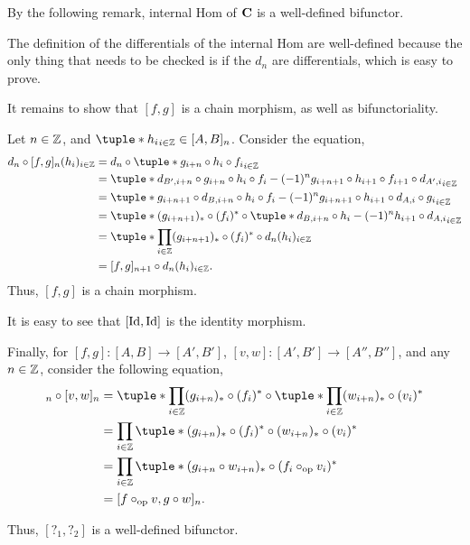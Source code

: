 By the following remark, internal Hom of \( \operatorname{\mathbf{C}} \) is a well-defined bifunctor.
\begin{remark}
    The definition of the differentials of the internal Hom are well-defined because the only thing that needs to be checked is if the \( d_n \) are differentials, which is easy to prove.

    It remains to show that \( [f, g] \) is a chain morphism, as well as bifunctoriality.

    Let \( n \in {\mathbb{Z}} \), and \( \tuple*{h_i}_{i \in \Zb} \in [A, B]_n \). Consider the equation,
    \begin{align*}
        d_n \circ [f, g]_n (h_i)_{i \in \Zb} &= d_n \circ \tuple*{g_{i + n} \circ h_i \circ f_i}_{i \in \Zb} \\
        &= \tuple*{d_{B', i + n} \circ g_{i + n} \circ h_i \circ f_i - (-1)^n g_{i + n + 1} \circ h_{i + 1} \circ f_{i + 1} \circ d_{A', i}}_{i \in \Zb} \\
        &= \tuple*{g_{i + n + 1} \circ d_{B, i + n} \circ h_i \circ f_i - (-1)^n g_{i + n + 1} \circ h_{i + 1} \circ d_{A, i} \circ g_i}_{i \in \Zb} \\
        &= \tuple*{(g_{i + n + 1})_* \circ (f_i)^* \circ \tuple*{d_{B, i + n} \circ h_i - (-1)^n h_{i + 1} \circ d_{A, i}}}_{i \in \Zb} \\
        &= \tuple*{\prod_{i \in \Zb} (g_{i + n + 1})_* \circ (f_i)^*} \circ d_n (h_i)_{i \in \Zb} \\
        &= [f, g]_{n + 1} \circ d_n (h_i)_{i \in \Zb}.
    \end{align*}
    Thus, \( [f, g] \) is a chain morphism.

    It is easy to see that \( [\operatorname{Id}, \operatorname{Id}] \) is the identity morphism.

    Finally, for \( [f, g]: [A, B] \to [A', B'] \), \( [v, w]: [A', B'] \to [A'', B''] \), and any \( n \in {\mathbb{Z}} \), consider the following equation,
    \begin{align*}
        [f, g]_n \circ [v, w]_n &= \tuple*{\prod_{i \in \Zb} (g_{i + n})_* \circ (f_i)^*} \circ \tuple*{\prod_{i \in \Zb} (w_{i + n})_* \circ (v_i)^*} \\
        &= \prod_{i \in \Zb} \tuple*{(g_{i + n})_* \circ (f_i)^* \circ (w_{i + n})_* \circ (v_i)^*} \\
        &= \prod_{i \in \Zb} \tuple*{(g_{i + n} \circ w_{i + n})_* \circ(f_i \circ_{\op} v_i)^*} \\
        &= [f \circ_{\op} v, g \circ w]_n.
    \end{align*}

    Thus, \( [?_1, ?_2] \) is a well-defined bifunctor.
\end{remark}

